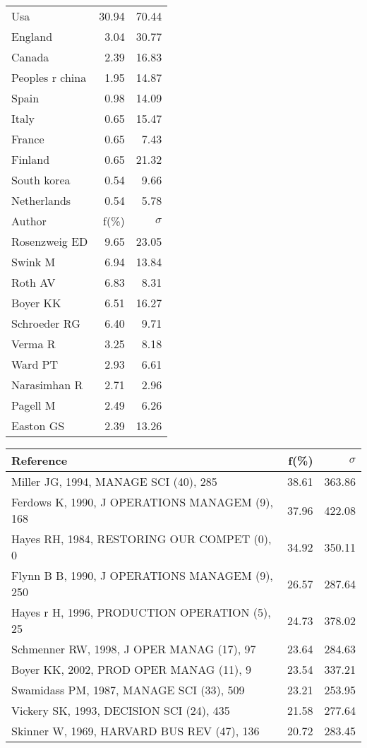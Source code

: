 \documentclass[a4paper,11pt]{report}
\begin{document}
\begin{landscape}
\begin{table}[!ht]
{\begin{tabular}{|l r r|}
\hline
Usa & 30.94 & 70.44\\
England & 3.04 & 30.77\\
Canada & 2.39 & 16.83\\
Peoples r china & 1.95 & 14.87\\
Spain & 0.98 & 14.09\\
Italy & 0.65 & 15.47\\
France & 0.65 & 7.43\\
Finland & 0.65 & 21.32\\
South korea & 0.54 & 9.66\\
Netherlands & 0.54 & 5.78\\
\hline
\hline
Author & f(\%) & $\sigma$\\
\hline
Rosenzweig ED & 9.65 & 23.05\\
Swink M & 6.94 & 13.84\\
Roth AV & 6.83 & 8.31\\
Boyer KK & 6.51 & 16.27\\
Schroeder RG & 6.40 & 9.71\\
Verma R & 3.25 & 8.18\\
Ward PT & 2.93 & 6.61\\
Narasimhan R & 2.71 & 2.96\\
Pagell M & 2.49 & 6.26\\
Easton GS & 2.39 & 13.26\\
\hline
\end{tabular}
}
{\scriptsize\begin{tabular}{|l r r|}
\hline
Reference & f(\%) & $\sigma$\\
\hline
Miller JG, 1994, MANAGE SCI (40), 285 & 38.61 & 363.86\\
Ferdows K, 1990, J OPERATIONS MANAGEM (9), 168 & 37.96 & 422.08\\
Hayes RH, 1984, RESTORING OUR COMPET (0), 0 & 34.92 & 350.11\\
Flynn B B, 1990, J OPERATIONS MANAGEM (9), 250 & 26.57 & 287.64\\
Hayes r H, 1996, PRODUCTION OPERATION (5), 25 & 24.73 & 378.02\\
Schmenner RW, 1998, J OPER MANAG (17), 97 & 23.64 & 284.63\\
Boyer KK, 2002, PROD OPER MANAG (11), 9 & 23.54 & 337.21\\
Swamidass PM, 1987, MANAGE SCI (33), 509 & 23.21 & 253.95\\
Vickery SK, 1993, DECISION SCI (24), 435 & 21.58 & 277.64\\
Skinner W, 1969, HARVARD BUS REV (47), 136 & 20.72 & 283.45\\

\end{tabular}}
\end{table}
\end{landscape}
\end{document}
